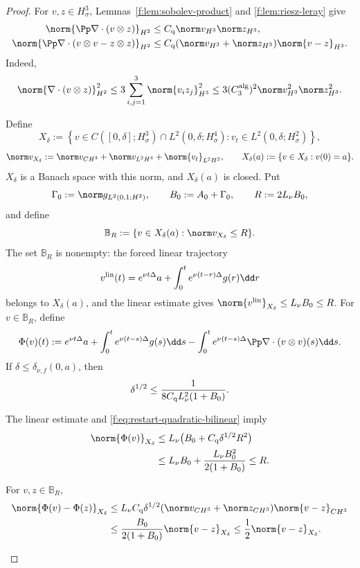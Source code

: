 \begin{proof}
For \(v,z\in H^3_\sigma\), Lemmas~\ref{f:lem:sobolev-product} and
\ref{f:lem:riesz-leray} give
\begin{align}
 \norm{\Pp\nabla\cdot(v\otimes z)}_{H^2}
 &\le C_{\rm q}\norm v_{H^3}\norm z_{H^3},
 \label{f:eq:restart-quadratic-bilinear}\\
 \norm{\Pp\nabla\cdot(v\otimes v-z\otimes z)}_{H^2}
 &\le C_{\rm q}(\norm v_{H^3}+\norm z_{H^3})
 \norm{v-z}_{H^3}.
 \label{f:eq:restart-quadratic-difference}
\end{align}
Indeed,
\[
 \norm{\nabla\cdot(v\otimes z)}_{H^2}^2
 \le3\sum_{i,j=1}^3\norm{v_i z_j}_{H^3}^2
 \le3(C_3^{\rm alg})^2\norm v_{H^3}^2\norm z_{H^3}^2.
\]

Define
\[
 X_\delta:=
 \left\{v\in C([0,\delta];H^3_\sigma)\cap L^2(0,\delta;H^4_\sigma):
 v_t\in L^2(0,\delta;H^2_\sigma)\right\},
\]
\[
 \norm v_{X_\delta}:=\norm v_{C H^3}
 +\norm v_{L^2H^4}+\norm{v_t}_{L^2H^2},
 \qquad
 X_\delta(a):=\{v\in X_\delta:v(0)=a\}.
\]
\(X_\delta\) is a Banach space with this norm, and \(X_\delta(a)\) is closed.
Put
\[
 \Gamma_0:=\norm g_{L^2(0,1;H^2)},
 \qquad B_0:=A_0+\Gamma_0,
 \qquad R:=2L_\nu B_0,
\]
and define
\[
 \mathbb B_R:=\{v\in X_\delta(a):\norm v_{X_\delta}\le R\}.
\]
The set \(\mathbb B_R\) is nonempty: the forced linear trajectory
\[
 v^{\rm lin}(t)=e^{\nu t\Delta}a
 +\int_0^te^{\nu(t-r)\Delta}g(r)\dd r
\]
belongs to \(X_\delta(a)\), and the linear estimate gives
\(\norm{v^{\rm lin}}_{X_\delta}\le L_\nu B_0\le R\).
For \(v\in\mathbb B_R\), define
\[
 \Phi(v)(t):=e^{\nu t\Delta}a
 +\int_0^te^{\nu(t-s)\Delta}g(s)\dd s
 -\int_0^te^{\nu(t-s)\Delta}
 \Pp\nabla\cdot(v\otimes v)(s)\dd s.
\]
If \(\delta\le\delta_{\nu,f}(0,a)\), then
\[
 \delta^{1/2}\le
 \frac{1}{8C_{\rm q}L_\nu^2(1+B_0)}.
\]
\begin{samepage}
The linear estimate and \eqref{f:eq:restart-quadratic-bilinear} imply
\begin{align*}
 \norm{\Phi(v)}_{X_\delta}
 &\le L_\nu\bigl(B_0+C_{\rm q}\delta^{1/2}R^2\bigr)\\
 &\le L_\nu B_0+\frac{L_\nu B_0^2}{2(1+B_0)}
 \le R.
\end{align*}
\end{samepage}
\begin{samepage}
For \(v,z\in\mathbb B_R\),
\begin{align*}
 \norm{\Phi(v)-\Phi(z)}_{X_\delta}
 &\le L_\nu C_{\rm q}\delta^{1/2}
 (\norm v_{C H^3}+\norm z_{C H^3})
 \norm{v-z}_{C H^3}\\
 &\le\frac{B_0}{2(1+B_0)}\norm{v-z}_{X_\delta}
 \le\frac12\norm{v-z}_{X_\delta}.

\end{align*}
\end{samepage}
\end{proof}

